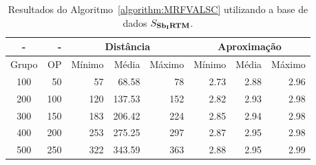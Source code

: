 \begin{table}[!htb]
  \caption{Resultados do Algoritmo~\ref{algorithm:MRFVALSC} utilizando a base de dados $S_{\textbf{Sb\textsubscript{I}RTM}}{}$.}
  \label{table:GLCTFFPM}
  \centering
  \begin{tabular}{|c|r|r|r|r|r|r|r|}
    \hline
      -      &  -   & \multicolumn{3}{c|}{Distância}             & \multicolumn{3}{c|}{Aproximação}           \\ \hline
    Grupo    & OP   & Mínimo       & Média        & Máximo       & Mínimo       & Média        & Máximo       \\ \hline  
    100      & 50   & 57           & 68.58        & 78           & 2.73         & 2.88         & 2.96         \\ \hline
    200      & 100  & 120          & 137.53       & 152          & 2.82         & 2.93         & 2.98         \\ \hline
    300      & 150  & 183          & 206.42       & 224          & 2.85         & 2.94         & 2.98         \\ \hline
    400      & 200  & 253          & 275.25       & 297          & 2.87         & 2.95         & 2.98         \\ \hline
    500      & 250  & 322          & 343.59       & 363          & 2.88         & 2.95         & 2.99         \\ \hline    
  \end{tabular}
\end{table}